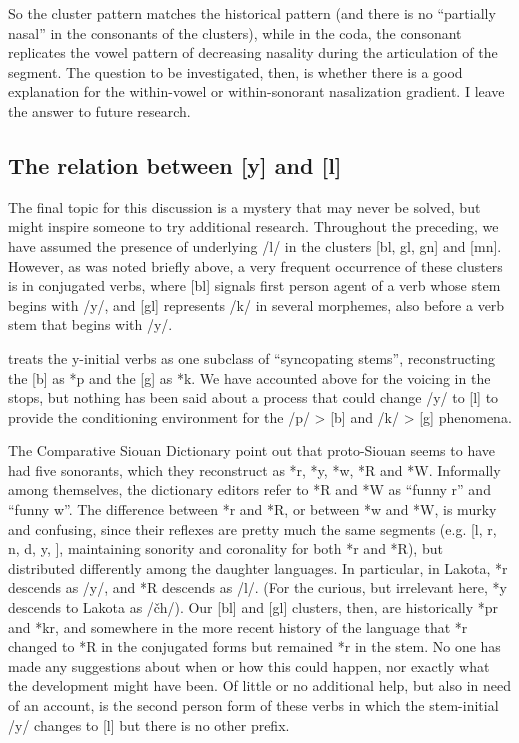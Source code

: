 \documentclass[output=paper]{LSP/langsci}
\begin{document}
So the cluster pattern matches the historical pattern (and there is no ``partially nasal'' in the consonants of the clusters), while in the coda, the consonant replicates the vowel pattern of decreasing nasality during the articulation of the segment. The question to be investigated, then, is whether there is a good explanation for the within-vowel or within-sonorant nasalization gradient. I leave the answer to future research.

\subsection{The relation between [y] and [l]}

The final topic for this discussion is a mystery that may never be solved, but might inspire someone to try additional research. Throughout the preceding, we have assumed the presence of underlying /l/ in the clusters [bl, gl, gn] and [mn]. However, as was noted briefly above, a very frequent occurrence of these clusters is in conjugated verbs, where [bl] signals first person agent of a verb whose stem begins with /y/, and [gl] represents /k/ in several morphemes, also before a verb stem that begins with /y/.

\citet{Koontz1991} treats the y-initial verbs as one subclass of ``syncopating stems'', reconstructing the [b] as *p and the [g] as *k. We have accounted above for the voicing in the stops, but nothing has been said about a process that could change /y/ to [l] to provide the conditioning environment for the /p/ > [b] and /k/ > [g] phenomena.

The Comparative Siouan Dictionary \citep{RankinEtAl1998,Rankinetal2015AccessSeptember} point out that proto-Siouan seems to have had five sonorants, which they reconstruct as *r, *y, *w, *R and *W. Informally among themselves, the dictionary editors refer to *R and *W as ``funny r'' and ``funny w''. The difference between *r and *R, or between *w and *W, is murky and confusing, since their reflexes are pretty much the same segments (e.g. [l, r, n, d, y, ], maintaining sonority and coronality for both *r and *R), but distributed differently among the daughter languages. In particular, in Lakota, *r descends as /y/, and *R descends as /l/. (For the curious, but irrelevant here, *y descends to Lakota as /\v{c}h/). Our [bl] and [gl] clusters, then, are historically *pr and *kr, and somewhere in the more recent history of the language that *r changed to *R in the conjugated forms but remained *r in the stem. No one has made any suggestions about when or how this could happen, nor exactly what the development might have been. Of little or no additional help, but also in need of an account, is the second person form of these verbs in which the stem-initial /y/ changes to [l] but there is no other prefix.
\end{document}
